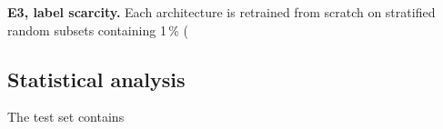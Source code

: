 \textbf{E3, label scarcity.} Each architecture is retrained from scratch on stratified random subsets containing 1\,\% (%

\subsection*{Statistical analysis}
The test set contains %
